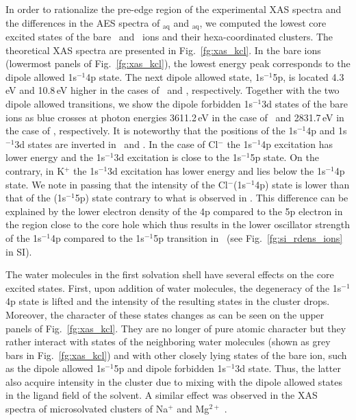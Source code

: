 In order to rationalize the pre-edge region of the experimental XAS spectra and the differences in the AES spectra of \ki$_{\text{aq}}$ and \cli$_{\text{aq}}$, we computed the lowest core excited states of the bare \ki~and \cli~ions and their hexa-coordinated clusters. The theoretical XAS spectra are presented in Fig.\ \ref{fg:xas_kcl}. In the bare ions (lowermost panels of Fig.\ \ref{fg:xas_kcl}), the lowest energy peak corresponds to the dipole allowed 1s$^{-1}$4p state. The next dipole allowed state, 1s$^{-1}$5p, is located 4.3\,eV and 10.8\,eV higher in the cases of \ki~and \cli, respectively. Together with the two dipole allowed transitions, we show the dipole forbidden 1s$^{-1}$3d states of the bare ions as blue crosses at photon energies 3611.2\,eV in the case of \ki~and 2831.7\,eV in the case of \cli, respectively. It is noteworthy that the positions of the 1s$^{-1}$4p and 1s$^{-1}$3d states are inverted in \ki~and \cli. In the case of Cl$^{-}$ the 1s$^{-1}$4p excitation has lower energy and the 1s$^{-1}$3d excitation is close to the 1s$^{-1}$5p state. On the contrary, in K$^{+}$ the 1s$^{-1}$3d excitation has lower energy and lies below the 1s$^{-1}$4p state. We note in passing that the intensity of the Cl$^{-}$(1s$^{-1}$4p) state is lower than that of the \cli(1s$^{-1}$5p) state contrary to what is observed in \ki. This difference can be explained by the lower electron density of the 4p compared to the 5p electron in the region close to the core hole which thus results in the lower oscillator strength of the 1s$^{-1}$4p compared to the 1s$^{-1}$5p transition in \cli~(see Fig.\ \ref{fg:si_rdens_ions} in SI).


The water molecules in the first solvation shell have several effects on the core excited states. First, upon addition of water molecules, the degeneracy of the 1s$^{-1}$4p state is lifted and the intensity of the resulting states in the cluster drops. Moreover, the character of these states changes as can be seen on the upper panels of Fig.\ \ref{fg:xas_kcl}. They are no longer of pure atomic character but they rather interact with states of the neighboring water molecules (shown as grey bars in Fig.\ \ref{fg:xas_kcl}) and with other closely lying states of the bare ion, such as the dipole allowed 1s$^{-1}$5p and dipole forbidden 1s$^{-1}$3d state. Thus, the latter also acquire intensity in the cluster due to mixing with the dipole allowed states in the ligand field of the solvent. A similar effect was observed in the XAS spectra of microsolvated clusters of Na$^{+}$ and Mg$^{2+}$ \citep{miteva16:16671}.


